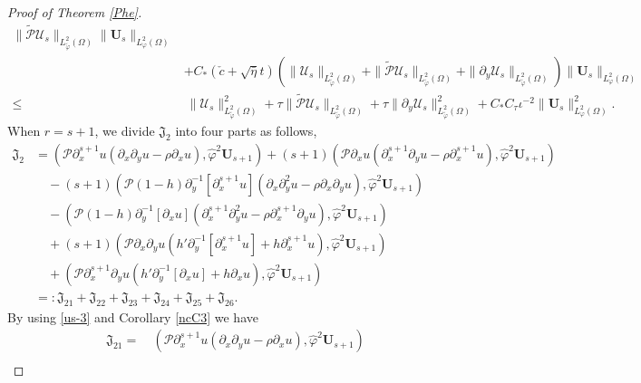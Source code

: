 \documentclass[10pt,a4paper]{amsart}
\begin{document}
\begin{proof}[Proof of Theorem \ref{Phe}]
\begin{align}
           \|\tilde{\mathcal{P}}\mathcal{U}_{s}\|_{L_{\tilde{\varphi}}^{2}(\Omega)}\|\mathbf{U}_{s}\|_{L_{\varphi}^{2}(\Omega)}\nonumber\\
    &+C_{*}(\check{c}+\sqrt{\bar{\eta}}t)
           \left(\|\mathcal{U}_{s}\|_{L_{\tilde{\varphi}}^{2}(\Omega)}
                 +\|\tilde{\mathcal{P}}\mathcal{U}_{s}\|_{L_{\tilde{\varphi}}^{2}(\Omega)}
                 +\|\partial_{y}\mathcal{U}_{s}\|_{L_{\tilde{\varphi}}^{2}(\Omega)}\right)
           \|\mathbf{U}_{s}\|_{L_{\varphi}^{2}(\Omega)}\nonumber\\
\leq&~\|\mathcal{U}_{s}\|_{L_{\tilde{\varphi}}^{2}(\Omega)}^{2}
     +\tau\|\tilde{\mathcal{P}}\mathcal{U}_{s}\|_{L_{\tilde{\varphi}}^{2}(\Omega)}
     +\tau\|\partial_{y}\mathcal{U}_{s}\|_{L_{\tilde{\varphi}}^{2}(\Omega)}^{2}
     +C_{*}C_{\tau}\iota^{-2}\|\mathbf{U}_{s}\|_{L_{\varphi}^{2}(\Omega)}^{2}.\nonumber
\end{align}
When $r=s+1$, we divide $\mathfrak{J}_{2}$ into four parts as follows,
\begin{align}\label{JJ2(2)}
\mathfrak{J}_{2}
&= (\mathcal{P}\partial_{x}^{s+1}u(\partial_{x}\partial_{y}u-\rho\partial_{x}u),\hat{\varphi}^{2}\mathbf{U}_{s+1})
  +(s+1)(\mathcal{P}\partial_{x}u(\partial_{x}^{s+1}\partial_{y}u-\rho\partial_{x}^{s+1}u),\hat{\varphi}^{2}\mathbf{U}_{s+1})\\
&\quad-(s+1)(\mathcal{P}(1-h)\partial_{y}^{-1}[\partial_{x}^{s+1}u](\partial_{x}\partial_{y}^{2}u-\rho\partial_{x}\partial_{y}u),\hat{\varphi}^{2}\mathbf{U}_{s+1})\nonumber\\
&\quad-(\mathcal{P}(1-h)\partial_{y}^{-1}[\partial_{x}u](\partial_{x}^{s+1}\partial_{y}^{2}u-\rho\partial_{x}^{s+1}\partial_{y}u),\hat{\varphi}^{2}\mathbf{U}_{s+1})\nonumber\\
&\quad+(s+1)(\mathcal{P}\partial_{x}\partial_{y}u(h'\partial_{y}^{-1}[\partial_{x}^{s+1}u]+h\partial_{x}^{s+1}u),\hat{\varphi}^{2}\mathbf{U}_{s+1})\nonumber\\
&\quad+(\mathcal{P}\partial_{x}^{s+1}\partial_{y}u(h'\partial_{y}^{-1}[\partial_{x}u]+h\partial_{x}u),\hat{\varphi}^{2}\mathbf{U}_{s+1})\nonumber\\
&=: \mathfrak{J}_{21}+\mathfrak{J}_{22}+\mathfrak{J}_{23}+\mathfrak{J}_{24}+\mathfrak{J}_{25}+\mathfrak{J}_{26}.\nonumber
\end{align}
By using \eqref{us-3} and Corollary \ref{ncC3} we have
\begin{align}\label{JJ21}
\mathfrak{J}_{21}
=&~(\mathcal{P}\partial_{x}^{s+1}u(\partial_{x}\partial_{y}u-\rho\partial_{x}u),\hat{\varphi}^{2}\mathbf{U}_{s+1})\\

\end{align}
\end{proof}
\end{document}
